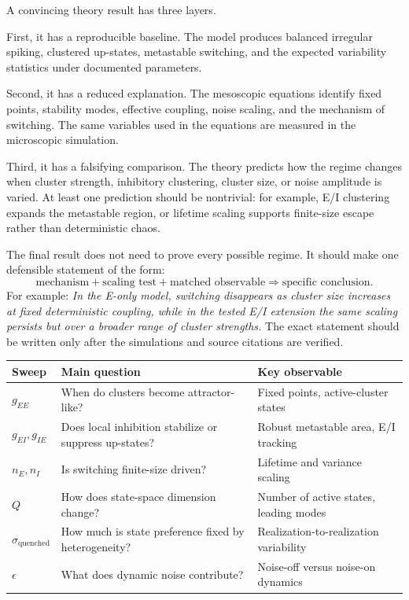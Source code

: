 A convincing theory result has three layers.

First, it has a reproducible baseline. The model produces balanced irregular spiking, clustered up-states, metastable switching, and the expected variability statistics under documented parameters.

Second, it has a reduced explanation. The mesoscopic equations identify fixed points, stability modes, effective coupling, noise scaling, and the mechanism of switching. The same variables used in the equations are measured in the microscopic simulation.

Third, it has a falsifying comparison. The theory predicts how the regime changes when cluster strength, inhibitory clustering, cluster size, or noise amplitude is varied. At least one prediction should be nontrivial: for example, E/I clustering expands the metastable region, or lifetime scaling supports finite-size escape rather than deterministic chaos.

The final result does not need to prove every possible regime. It should make one defensible statement of the form:
%
\begin{equation}
  \text{mechanism} + \text{scaling test} + \text{matched observable}
  \Rightarrow
  \text{specific conclusion}.
  \label{eq:theory-result-template}
\end{equation}
%
For example: \emph{In the E-only model, switching disappears as cluster size increases at fixed deterministic coupling, while in the tested E/I extension the same scaling persists but over a broader range of cluster strengths.} The exact statement should be written only after the simulations and source citations are verified.

\begin{chaptersummary}

\begin{center}
\renewcommand{\arraystretch}{1.45}
\begin{tabularx}{\textwidth}{@{}l X X@{}}
  \toprule
  \textbf{Sweep} & \textbf{Main question} & \textbf{Key observable} \\
  \midrule
  $g_{EE}$ & When do clusters become attractor-like? & Fixed points, active-cluster states \\
  $g_{EI},g_{IE}$ & Does local inhibition stabilize or suppress up-states? & Robust metastable area, E/I tracking \\
  $n_E,n_I$ & Is switching finite-size driven? & Lifetime and variance scaling \\
  $Q$ & How does state-space dimension change? & Number of active states, leading modes \\
  $\sigma_{\mathrm{quenched}}$ & How much is state preference fixed by heterogeneity? & Realization-to-realization variability \\
  $\epsilon$ & What does dynamic noise contribute? & Noise-off versus noise-on dynamics \\
  \bottomrule
\end{tabularx}
\end{center}

\end{chaptersummary}

